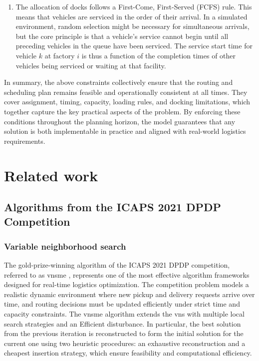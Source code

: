 \documentclass[preprint,12pt]{elsarticle}
\begin{document}
\begin{enumerate}
    \item The allocation of docks follows a First-Come, First-Served (FCFS) rule. This means that vehicles are serviced in the order of their arrival. In a simulated environment, random selection might be necessary for simultaneous arrivals, but the core principle is that a vehicle's service cannot begin until all preceding vehicles in the queue have been serviced. The service start time for vehicle $k$ at factory $i$ is thus a function of the completion times of other vehicles being serviced or waiting at that facility.
    
\end{enumerate}

In summary, the above constraints collectively ensure that the routing and scheduling plan remains feasible and operationally consistent at all times. They cover assignment, timing, capacity, loading rules, and docking limitations, which together capture the key practical aspects of the problem. By enforcing these conditions throughout the planning horizon, the model guarantees that any solution is both implementable in practice and aligned with real-world logistics requirements.

\section{Related work}\label{sec:related}
\subsection{Algorithms from the ICAPS 2021 DPDP Competition}
\subsubsection{Variable neighborhood search}
The gold-prize-winning algorithm of the ICAPS 2021 DPDP competition, referred to as \gls{vnsme} \cite{cai2022variable}, represents one of the most effective algorithm frameworks designed for real-time logistics optimization. The competition problem models a realistic dynamic environment where new pickup and delivery requests arrive over time, and routing decisions must be updated efficiently under strict time and capacity constraints. The \gls{vnsme} algorithm extends the \gls{vns} with multiple local search strategies and an Efficient disturbance. In particular, the best solution from the previous iteration is reconstructed to form the initial solution for the current one using two heuristic procedures: an exhaustive reconstruction and a cheapest insertion strategy, which ensure feasibility and computational efficiency.
\end{document}
